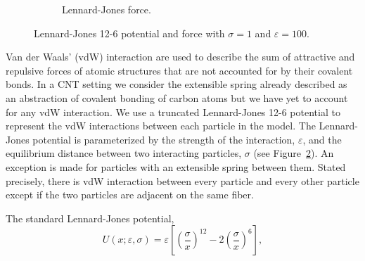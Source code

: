 \begin{figure}[t!]
\begin{subfigure}[t]{.5\textwidth}
			\caption{Lennard-Jones force. \label{subfig:LJForce}}
		\end{subfigure}		
		\caption{Lennard-Jones 12-6 potential and force with $\sigma = 1$ and $\varepsilon = 100$.\label{fig:LJ}}	
	\end{figure}

   Van der Waals' (vdW) interaction are used to describe the sum of attractive and repulsive forces of atomic structures that are not accounted for by their covalent bonds. In a CNT setting we consider the extensible spring already described as an abstraction of covalent bonding of carbon atoms but we have yet to account for any vdW interaction. We use a truncated Lennard-Jones 12-6 potential to represent the vdW interactions between each particle in the model. The Lennard-Jones potential is parameterized by the strength of the interaction, $\varepsilon$, and the equilibrium distance between two interacting particles, $\sigma$ (see Figure~\ref{fig:LJ}). An exception is made for particles with an extensible spring between them. Stated precisely, there is vdW interaction between every particle and every other particle except if the two particles are adjacent on the same fiber.
	
The standard Lennard-Jones potential,
\begin{equation}
	U(x; \varepsilon, \sigma) = \varepsilon \left[ \left( \frac{\sigma}{x} \right)^{12} - 2 \left( \frac{\sigma}{x} \right)^6 \right],
\end{equation}

